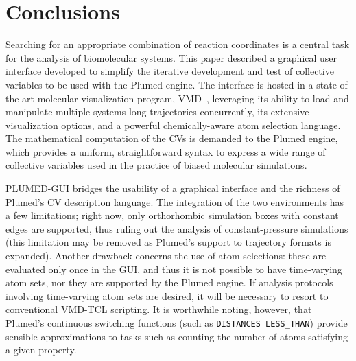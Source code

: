 \documentclass[preprint,12pt]{elsarticle}
\begin{document}










\section{Conclusions}

Searching for an appropriate combination of reaction coordinates is a
central task for the analysis of biomolecular systems.  This paper
described a graphical user interface developed to simplify the
iterative development and test of collective variables to be used with
the Plumed engine. The interface is hosted in a state-of-the-art
molecular visualization program,
VMD~\cite{Humphrey_Dalke_Schulten_1996}, leveraging its ability to
load and manipulate multiple systems long trajectories
concurrently, its extensive visualization options, and a powerful
chemically-aware atom selection language. The mathematical computation
of the CVs is demanded to the Plumed engine, which
provides a uniform, straightforward syntax to express a wide range of
collective variables used in the practice of biased molecular simulations.

PLUMED-GUI bridges the usability of a graphical interface and the
richness of Plumed's CV description language.  The integration of the
two environments has a few limitations; right now, only orthorhombic
simulation boxes with constant edges are supported, thus ruling out
the analysis of constant-pressure simulations (this limitation may be
removed as Plumed's support to trajectory formats is
expanded). Another drawback concerns the use of atom selections: these
are evaluated only once in the GUI, and thus it is not possible to
have time-varying atom sets, nor they are supported by the Plumed
engine.  If analysis protocols involving time-varying atom sets are
desired, it will be necessary to resort to conventional VMD-TCL
scripting. It is worthwhile noting, however, that Plumed's continuous
switching functions (such as \texttt{DISTANCES LESS\_THAN})
provide sensible approximations to tasks such as counting the number
of atoms satisfying a given property.
\end{document}
